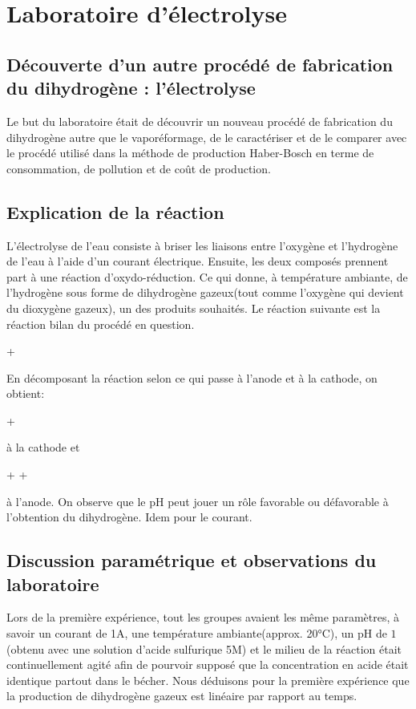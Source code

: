 \section{Laboratoire d'électrolyse}
\subsection{Découverte d'un autre procédé de fabrication du dihydrogène : l'électrolyse}
Le but du laboratoire était de découvrir un nouveau procédé de
fabrication du dihydrogène autre que le vaporéformage, de le
caractériser et de le comparer avec le procédé utilisé dans la
méthode de production Haber-Bosch en terme de consommation, de
pollution et de coût de production.

\subsection{Explication de la réaction}
L'électrolyse de l'eau consiste à briser les liaisons entre
l'oxygène et l'hydrogène de l'eau à l'aide d'un courant électrique.
Ensuite, les deux composés prennent part à une réaction d'oxydo-réduction.
Ce qui donne, à température ambiante, de l'hydrogène sous forme de
dihydrogène gazeux(tout comme l'oxygène qui devient du dioxygène gazeux),
un des produits souhaités. Le réaction suivante est la réaction bilan du
procédé en question.

\begin{chemmath}
 \rightleftharpoons {} + 
\end{chemmath}

En décomposant la réaction selon ce qui passe à l'anode et à la cathode, 
on obtient:

\begin{chemmath}
 +  \rightleftharpoons {}
\end{chemmath}

à la cathode et

\begin{chemmath}
 \rightleftharpoons {} +  + 
\end{chemmath}

à l'anode. On observe que le pH peut jouer un rôle favorable ou 
défavorable à l'obtention du dihydrogène. Idem pour le courant.

\subsection{Discussion paramétrique et observations du laboratoire}
Lors de la première expérience, tout les groupes avaient les même paramètres,
à savoir un courant de \unit{1}{A}, une température ambiante(approx. \unit{20}{°C}),
un pH de $1$(obtenu avec une solution d'acide sulfurique \unit{5}{M}) et le milieu de
la réaction était continuellement agité afin de pourvoir supposé que la 
concentration en acide était identique partout dans le bécher. Nous déduisons 
pour la première expérience que la production de dihydrogène gazeux est linéaire 
par rapport au temps.


